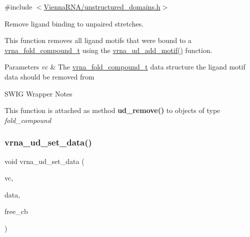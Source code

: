 {\ttfamily \#include $<$\mbox{\hyperlink{unstructured__domains_8h}{Vienna\+R\+N\+A/unstructured\+\_\+domains.\+h}}$>$}



Remove ligand binding to unpaired stretches. 

This function removes all ligand motifs that were bound to a \mbox{\hyperlink{group__fold__compound_ga1b0cef17fd40466cef5968eaeeff6166}{vrna\+\_\+fold\+\_\+compound\+\_\+t}} using the \mbox{\hyperlink{group__domains__up_ga55f7de5ef5b7472b0eeab9296b57f671}{vrna\+\_\+ud\+\_\+add\+\_\+motif()}} function.


\begin{DoxyParams}{Parameters}
{\em vc} & The \mbox{\hyperlink{group__fold__compound_ga1b0cef17fd40466cef5968eaeeff6166}{vrna\+\_\+fold\+\_\+compound\+\_\+t}} data structure the ligand motif data should be removed from\\
\hline
\end{DoxyParams}
\begin{DoxyRefDesc}{S\+W\+I\+G Wrapper Notes}
\item[\mbox{\hyperlink{wrappers__wrappers000083}{S\+W\+I\+G Wrapper Notes}}]This function is attached as method {\bfseries{ud\+\_\+remove()}} to objects of type {\itshape fold\+\_\+compound} \end{DoxyRefDesc}
\mbox{\label{group__domains__up_gac1f18c312b91d80089534a87d956e58b}} 
\subsubsection{\texorpdfstring{vrna\_ud\_set\_data()}{vrna\_ud\_set\_data()}}
{\footnotesize\ttfamily void vrna\+\_\+ud\+\_\+set\+\_\+data (\begin{DoxyParamCaption}\item[{\mbox{\hyperlink{group__fold__compound_ga1b0cef17fd40466cef5968eaeeff6166}{vrna\+\_\+fold\+\_\+compound\+\_\+t}} $\ast$}]{vc,  }\item[{void $\ast$}]{data,  }\item[{\mbox{\hyperlink{group__fold__compound_ga7806651f51b195013839a218b3bbd5a3}{vrna\+\_\+callback\+\_\+free\+\_\+auxdata}} $\ast$}]{free\+\_\+cb }\end{DoxyParamCaption})}



